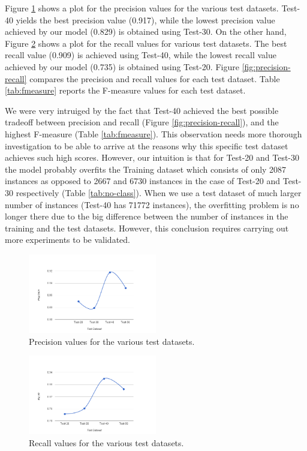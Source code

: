 \documentclass[10pt,twocolumn,letterpaper]{article}
\begin{document}
Figure \ref{fig:precision} shows a plot for the precision values for the various test datasets. Test-40 yields the best precision value (0.917), while the
lowest precision value achieved by our model (0.829) is obtained using Test-30. On the other hand, Figure \ref{fig:recall} shows a plot for the recall values
for various test datasets. The best recall value (0.909) is achieved using Test-40, while the lowest recall value achieved by our model (0.735) is obtained
using Test-20. Figure \ref{fig:precision-recall} compares the precision and recall values for each test dataset. Table \ref{tab:fmeasure} reports the F-measure
values for each test dataset.

We were very intruiged by the fact that Test-40 achieved the best possible tradeoff between precision and recall (Figure \ref{fig:precision-recall}), and the
highest F-measure (Table \ref{tab:fmeasure}). This observation needs more thorough investigation to be able to arrive at the reasons why this specific test
dataset achieves such high scores. However, our intuition is that for Test-20 and Test-30 the model probably overfits the Training dataset which consists of
only 2087 instances as opposed to 2667 and 6730 instances in the case of Test-20 and Test-30 respectively (Table \ref{tab:no-class}). When we use a test dataset
of much larger number of instances (Test-40 has 71772 instances), the overfitting problem is no longer there due to the big difference between the number of
instances in the training and the test datasets. However, this conclusion requires carrying out more experiments to be validated.

\begin{figure}[h!]
\centering
\includegraphics[width=0.5\textwidth]{imgs/precision.png}
\caption{Precision values for the various test datasets.}
\label{fig:precision}
\end{figure}

\begin{figure}[h!]
\centering
\includegraphics[width=0.5\textwidth]{imgs/recall.png}
\caption{Recall values for the various test datasets.}
\label{fig:recall}
\end{figure}
\end{document}
